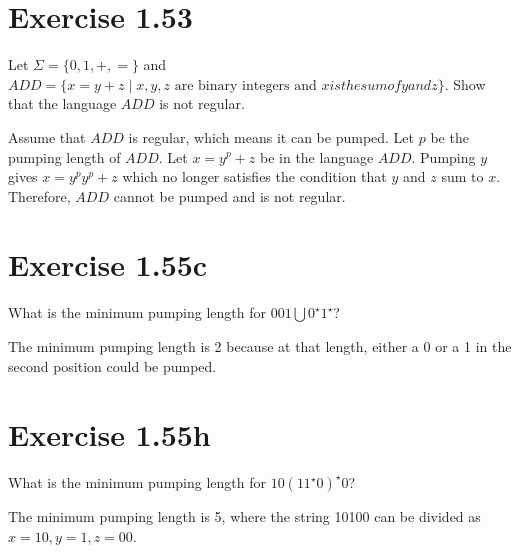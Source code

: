 \documentclass{article}
\newcommand{\union}{\bigcup}
\newcommand{\where}{\mid}
\begin{document}
\section{Exercise 1.53}

Let $\Sigma = \{0, 1, +, =\}$ and $ADD = \{ x=y+z \where x, y, z \text{ are
binary integers and } x { is the sum of } y { and } z\}$. Show that the language
$ADD$ is not regular.

Assume that $ADD$ is regular, which means it can be pumped. Let $p$ be the
pumping length of $ADD$. Let $x=y^p + z$ be in the language $ADD$. Pumping $y$
gives $x = y^p y^p + z$ which no longer satisfies the condition that $y$ and $z$
sum to $x$. Therefore, $ADD$ cannot be pumped and is not regular.

\section{Exercise 1.55c}

What is the minimum pumping length for $001 \union 0^\star1^\star$?

The minimum pumping length is 2 because at that length, either a 0 or a 1
in the second position could be pumped. 

\section{Exercise 1.55h}

What is the minimum pumping length for $10(11^\star0)^\star0$?

The minimum pumping length is 5, where the string 10100 can be divided as $x
= 10, y = 1, z = 00$.
\end{document}

